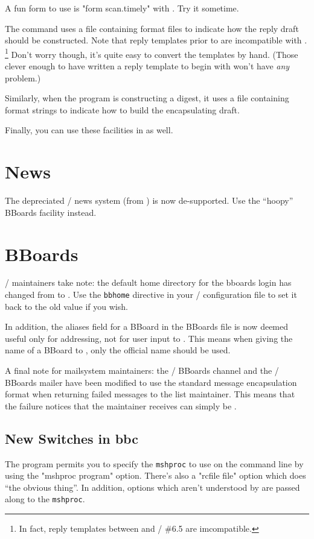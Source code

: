A fun form to use is \switch"form scan.timely" with .
Try it sometime.


The  command uses a file containing format files to
indicate how the reply draft should be constructed.
Note that reply templates prior to  are incompatible with .%
\footnote{In fact, reply templates between  and \MH/ \#6.5 are
imcompatible.}
Don't worry though,
it's quite easy to convert the templates by hand.
(Those clever enough to have written a reply template to begin with won't
have {\em any\/} problem.)

Similarly, when the  program is constructing a digest,
it uses a file containing format strings to indicate how to build the
encapsulating draft.

Finally, you can use these facilities in  as well.

\section*	{News}
The depreciated \MH/ news system (from ) is now de-supported.
Use the ``hoopy'' BBoards facility instead.

\section*	{BBoards}
\MH/ maintainers take note:
the default home directory for the bboards login has changed from
 to .
Use the \verb"bbhome" directive in your \MH/ configuration file to set
it back to the old value if you wish.

In addition, the aliases field for a BBoard in the BBoards file is now
deemed useful only for addressing, not for user input to .
This means when giving the name of a BBoard to ,
only the official name should be used.

A final note for mailsystem maintainers:
the \MMDFII/ BBoards channel and the \SendMail/ BBoards mailer have been
modified to use the standard message encapsulation format when returning
failed messages to the list maintainer.
This means that the failure notices that the maintainer receives can
simply be .

\subsection*	{New Switches in bbc}
The  program permits you to specify the \verb"mshproc" to use on the
command line by using the \switch"mshproc program" option.
There's also a \switch"rcfile file" option which does ``the obvious thing''.
In addition, options which aren't understood by  are passed along to
the \verb"mshproc".

